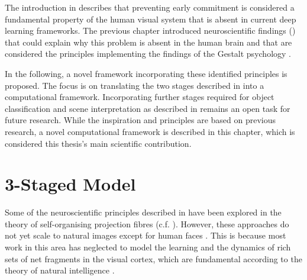 The introduction in  describes that preventing early commitment \cite{marr_vision_2010} is considered a fundamental property of the human visual system that is absent in current deep learning frameworks.
The previous chapter introduced neuroscientific findings () that could explain why this problem is absent in the human brain and that are considered the principles implementing the findings of the Gestalt psychology \cite{ellis_source_1938, kohler_gestalt_1992, wagemans_century_2012, hamlyn_psychology_2017}.

In the following, a novel framework incorporating these identified principles is proposed.
The focus is on translating the two stages described in  into a computational framework.
Incorporating further stages required for object classification and scene interpretation as described in  remains an open task for future research.
While the inspiration and principles are based on previous research, a novel computational framework is described in this chapter, which is considered this thesis's main scientific contribution.

\section{3-Staged Model}
Some of the neuroscientific principles described in  have been explored in the theory of self-organising projection fibres  (c.f. ). However, these approaches do not yet scale to natural images except for human faces . This is because most work in this area has neglected to model the learning and the dynamics of rich sets of net fragments in the visual cortex, which are fundamental according to the theory of natural intelligence .


